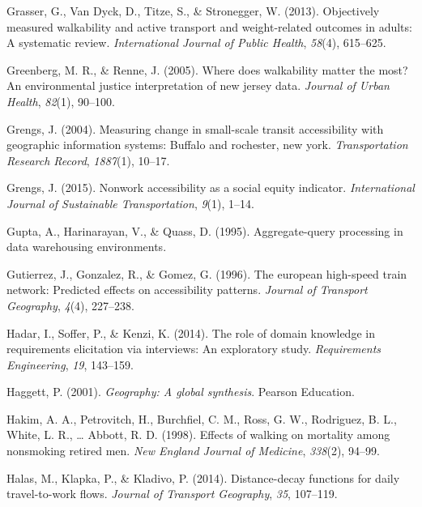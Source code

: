 \documentclass[
11pt, %
oneside, %
english, %
singlespacing, %
]{macthesis} %
\newlength{\cslhangindent}
\newenvironment{CSLReferences}[2] %
 {%
  \setlength{\parindent}{0pt}
  \ifodd #1 \everypar{\setlength{\hangindent}{\cslhangindent}}\ignorespaces\fi
  \ifnum #2 > 0
  \setlength{\parskip}{#2\baselineskip}
  \fi
 }%
 {}
\begin{document}
\begin{CSLReferences}{1}{0}
\leavevmode{}%
Grasser, G., Van Dyck, D., Titze, S., \& Stronegger, W. (2013). Objectively measured walkability and active transport and weight-related outcomes in adults: A systematic review. \emph{International Journal of Public Health}, \emph{58}(4), 615--625.

\leavevmode{}%
Greenberg, M. R., \& Renne, J. (2005). Where does walkability matter the most? An environmental justice interpretation of new jersey data. \emph{Journal of Urban Health}, \emph{82}(1), 90--100.

\leavevmode{}%
Grengs, J. (2004). Measuring change in small-scale transit accessibility with geographic information systems: Buffalo and rochester, new york. \emph{Transportation Research Record}, \emph{1887}(1), 10--17.

\leavevmode{}%
Grengs, J. (2015). Nonwork accessibility as a social equity indicator. \emph{International Journal of Sustainable Transportation}, \emph{9}(1), 1--14.

\leavevmode{}%
Gupta, A., Harinarayan, V., \& Quass, D. (1995). Aggregate-query processing in data warehousing environments.

\leavevmode{}%
Gutierrez, J., Gonzalez, R., \& Gomez, G. (1996). The european high-speed train network: Predicted effects on accessibility patterns. \emph{Journal of Transport Geography}, \emph{4}(4), 227--238.

\leavevmode{}%
Hadar, I., Soffer, P., \& Kenzi, K. (2014). The role of domain knowledge in requirements elicitation via interviews: An exploratory study. \emph{Requirements Engineering}, \emph{19}, 143--159.

\leavevmode{}%
Haggett, P. (2001). \emph{Geography: A global synthesis}. Pearson Education.

\leavevmode{}%
Hakim, A. A., Petrovitch, H., Burchfiel, C. M., Ross, G. W., Rodriguez, B. L., White, L. R., \ldots{} Abbott, R. D. (1998). Effects of walking on mortality among nonsmoking retired men. \emph{New England Journal of Medicine}, \emph{338}(2), 94--99.

\leavevmode{}%
Halas, M., Klapka, P., \& Kladivo, P. (2014). Distance-decay functions for daily travel-to-work flows. \emph{Journal of Transport Geography}, \emph{35}, 107--119.


\end{CSLReferences}
\end{document}

